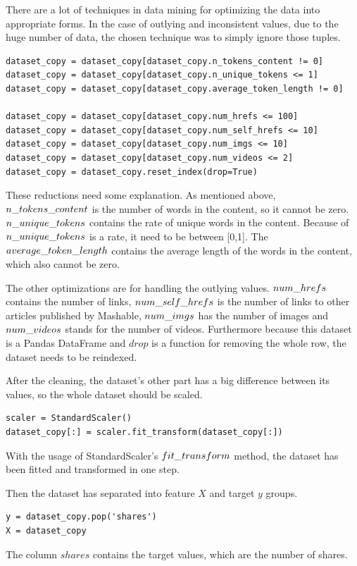 There are a lot of techniques in data mining for optimizing the data into appropriate forms. In the case of outlying and inconsistent values, due to the huge number of data, the chosen technique was to simply ignore those tuples. 
\begin{lstlisting}
dataset_copy = dataset_copy[dataset_copy.n_tokens_content != 0]
dataset_copy = dataset_copy[dataset_copy.n_unique_tokens <= 1]
dataset_copy = dataset_copy[dataset_copy.average_token_length != 0]

dataset_copy = dataset_copy[dataset_copy.num_hrefs <= 100]
dataset_copy = dataset_copy[dataset_copy.num_self_hrefs <= 10]
dataset_copy = dataset_copy[dataset_copy.num_imgs <= 10]
dataset_copy = dataset_copy[dataset_copy.num_videos <= 2]
dataset_copy = dataset_copy.reset_index(drop=True)
\end{lstlisting}

These reductions need some explanation. As mentioned above, $n\char`_tokens\char`_content$ is the number of words in the content, so it cannot be zero. $n\char`_unique\char`_tokens$ contains the rate of unique words in the content. Because of $n\char`_unique\char`_tokens$ is a rate, it need to be between [0,1]. The $average\char`_token\char`_length$ contains the average length of the words in the content, which also cannot be zero. \smallskip

The other optimizations are for handling the outlying values. $num\char`_hrefs$ contains the number of links, $num\char`_self\char`_hrefs$ is the number of links to other articles published by Mashable, $num\char`_imgs$ has the number of images and $num\char`_videos$ stands for the number of videos. Furthermore because this dataset is a Pandas DataFrame and $drop$ is a function for removing the whole row, the dataset needs to be reindexed.\medskip

After the cleaning, the dataset's other part has a big difference between its values, so the whole dataset should be scaled. 
\begin{lstlisting}
scaler = StandardScaler()
dataset_copy[:] = scaler.fit_transform(dataset_copy[:])
\end{lstlisting}
With the usage of StandardScaler's $fit\char`_transform$ method, the dataset has been fitted and transformed in one step. \medskip

\noindent Then the dataset has separated into feature $X$ and target $y$ groups.
\begin{lstlisting}
y = dataset_copy.pop('shares')
X = dataset_copy
\end{lstlisting}
The column $shares$ contains the target values, which are the number of shares.\medskip

